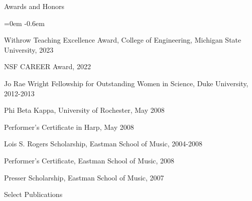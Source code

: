 \documentclass{resume} %
\begin{document}
\begin{rSection}{Awards and Honors}

\begin{list}{}{\leftmargin=0em}
   \itemsep -0.6em %
\item Withrow Teaching Excellence Award, College of Engineering, Michigan State University, 2023
\item NSF CAREER Award, 2022
\item
Jo Rae Wright Fellowship for Outstanding Women in Science, Duke University, 2012-2013
\item
Phi Beta Kappa, University of Rochester, May 2008


\item
Performer's Certificate in Harp, May 2008



\item
Lois S. Rogers Scholarship, Eastman School of Music, 2004-2008

\item Performer's Certificate, Eastman School of Music, 2008 
\item
Presser Scholarship, Eastman School of Music, 2007


\end{list}


\end{rSection}


\newpage

\nocite{*}

\begin{rSection}{Select Publications}

\phantom{x}
\vspace{-1em}

\printbibliography[heading=none]


\end{rSection}

%
\end{document}
